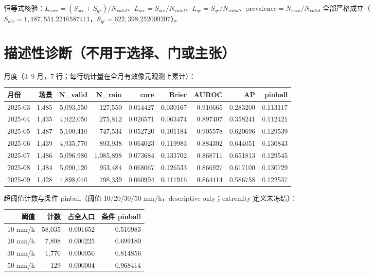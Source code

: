 \documentclass[UTF8,11pt,a4paper,fontset=windows]{ctexart}
\begin{document}
恒等式核验：$L_{core}=(S_{occ}+S_{qr})/N_{valid}$、$L_{occ}=S_{occ}/N_{valid}$、$L_{qr}=S_{qr}/N_{valid}$、prevalence$=N_{rain}/N_{valid}$ 全部严格成立（$S_{occ}=1{,}187{,}551.2216587411$，$S_{qr}=622{,}398.252009207$）。

\section{描述性诊断（不用于选择、门或主张）}
月度（3--9 月，7 行；每行统计量在全月有效像元观测上累计）：

{\footnotesize\begin{longtable}{lrrrrrrrr}
\textbf{月份} & \textbf{场景} & \textbf{N\_valid} & \textbf{N\_rain} & \textbf{core} & \textbf{Brier} & \textbf{AUROC} & \textbf{AP} & \textbf{pinball}\\\hline
2025-03 & 1,485 & 5,093,550 & 127,550 & 0.014427 & 0.030167 & 0.910665 & 0.283200 & 0.113117\\
2025-04 & 1,435 & 4,922,050 & 275,812 & 0.026571 & 0.063474 & 0.897407 & 0.358241 & 0.112421\\
2025-05 & 1,487 & 5,100,410 & 747,534 & 0.052720 & 0.101184 & 0.905578 & 0.620696 & 0.129539\\
2025-06 & 1,439 & 4,935,770 & 893,938 & 0.064023 & 0.119983 & 0.884302 & 0.644051 & 0.130843\\
2025-07 & 1,486 & 5,096,980 & 1,085,898 & 0.073684 & 0.133702 & 0.868711 & 0.651813 & 0.129545\\
2025-08 & 1,484 & 5,090,120 & 953,484 & 0.068067 & 0.126533 & 0.866927 & 0.617100 & 0.130729\\
2025-09 & 1,428 & 4,898,040 & 798,339 & 0.060994 & 0.117916 & 0.864414 & 0.586758 & 0.122557\\\hline
\end{longtable}}

超阈值计数与条件 pinball（阈值 10/20/30/50 mm/h，descriptive only；extremity 定义未冻结）：

\begin{longtable}{rrrr}
\textbf{阈值} & \textbf{计数} & \textbf{占全人口} & \textbf{条件 pinball}\\\hline
10 mm/h & 58,035 & 0.001652 & 0.510983\\
20 mm/h & 7,898 & 0.000225 & 0.699180\\
30 mm/h & 1,770 & 0.000050 & 0.814856\\
50 mm/h & 129 & 0.000004 & 0.968414\\\hline
\end{longtable}
\end{document}
